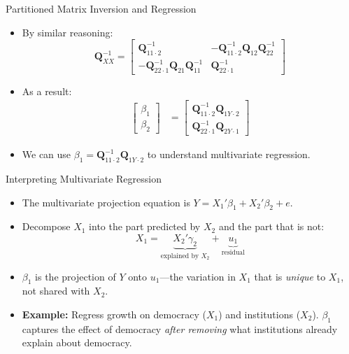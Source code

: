 \documentclass[aspectratio=169, handout, t]{beamer}
\numberwithin{equation}{section}
\begin{document}
\begin{frame}{Partitioned Matrix Inversion and Regression}
\begin{itemize}
\item By similar reasoning:
$$\bm{Q}_{XX}^{-1}=\begin{bmatrix} \mathbf{Q}_{11\cdot 2}^{-1} &-\mathbf{Q}_{11\cdot 2}^{-1}\mathbf{Q}_{12}\mathbf{Q}_{22}^{-1}\\ -\mathbf{Q}_{22\cdot 1}^{-1}\mathbf{Q}_{21}\mathbf{Q}_{11}^{-1}&\mathbf{Q}_{22\cdot 1}^{-1}\end{bmatrix}$$
\item As a result:
\begin{align*}
\begin{bmatrix}\beta_1\\\beta_2\end{bmatrix}&=\begin{bmatrix} \mathbf{Q}_{11\cdot 2}^{-1} \mathbf{Q}_{1Y\cdot 2}\\ \mathbf{Q}_{22\cdot 1}^{-1} \mathbf{Q}_{2Y\cdot 1} \end{bmatrix}
\end{align*}
\item We can use $\beta_1=\mathbf{Q}_{11\cdot 2}^{-1} \mathbf{Q}_{1Y\cdot 2}$ to understand multivariate regression.
\end{itemize}
\end{frame}

\begin{frame}{Interpreting Multivariate Regression}
\begin{itemize}
\item The multivariate projection equation is $Y=X_1'\beta_1+X_2'\beta_2+e$.
\item Decompose $X_1$ into the part predicted by $X_2$ and the part that is not:
$$X_1 = \underbrace{X_2'\gamma_2}_{\text{explained by }X_2} + \underbrace{u_1}_{\text{residual}}$$
\pause
\item $\beta_1$ is the projection of $Y$ onto $u_1$---the variation in $X_1$ that is \emph{unique} to $X_1$, not shared with $X_2$.
\pause
\item \textbf{Example:} Regress growth on democracy ($X_1$) and institutions ($X_2$).  $\beta_1$ captures the effect of democracy \emph{after removing} what institutions already explain about democracy.
\end{itemize}
\end{frame}
\end{document}
